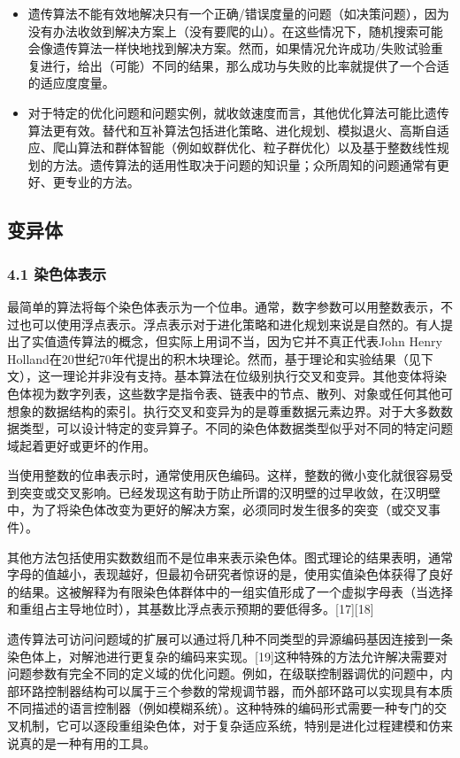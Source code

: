 \begin{itemize}
\item 遗传算法不能有效地解决只有一个正确/错误度量的问题（如决策问题），因为没有办法收敛到解决方案上（没有要爬的山）。在这些情况下，随机搜索可能会像遗传算法一样快地找到解决方案。然而，如果情况允许成功/失败试验重复进行，给出（可能）不同的结果，那么成功与失败的比率就提供了一个合适的适应度度量。
\item 对于特定的优化问题和问题实例，就收敛速度而言，其他优化算法可能比遗传算法更有效。替代和互补算法包括进化策略、进化规划、模拟退火、高斯自适应、爬山算法和群体智能（例如蚁群优化、粒子群优化）以及基于整数线性规划的方法。遗传算法的适用性取决于问题的知识量；众所周知的问题通常有更好、更专业的方法。
\end{itemize}

\subsection{变异体}
\subsubsection{4.1 染色体表示}
最简单的算法将每个染色体表示为一个位串。通常，数字参数可以用整数表示，不过也可以使用浮点表示。浮点表示对于进化策略和进化规划来说是自然的。有人提出了实值遗传算法的概念，但实际上用词不当，因为它并不真正代表John Henry Holland在20世纪70年代提出的积木块理论。然而，基于理论和实验结果（见下文），这一理论并非没有支持。基本算法在位级别执行交叉和变异。其他变体将染色体视为数字列表，这些数字是指令表、链表中的节点、散列、对象或任何其他可想象的数据结构的索引。执行交叉和变异为的是尊重数据元素边界。对于大多数数据类型，可以设计特定的变异算子。不同的染色体数据类型似乎对不同的特定问题域起着更好或更坏的作用。

当使用整数的位串表示时，通常使用灰色编码。这样，整数的微小变化就很容易受到突变或交叉影响。已经发现这有助于防止所谓的汉明壁的过早收敛，在汉明壁中，为了将染色体改变为更好的解决方案，必须同时发生很多的突变（或交叉事件）。

其他方法包括使用实数数组而不是位串来表示染色体。图式理论的结果表明，通常字母的值越小，表现越好，但最初令研究者惊讶的是，使用实值染色体获得了良好的结果。这被解释为有限染色体群体中的一组实值形成了一个虚拟字母表（当选择和重组占主导地位时），其基数比浮点表示预期的要低得多。[17][18]

遗传算法可访问问题域的扩展可以通过将几种不同类型的异源编码基因连接到一条染色体上，对解池进行更复杂的编码来实现。[19]这种特殊的方法允许解决需要对问题参数有完全不同的定义域的优化问题。例如，在级联控制器调优的问题中，内部环路控制器结构可以属于三个参数的常规调节器，而外部环路可以实现具有本质不同描述的语言控制器（例如模糊系统）。这种特殊的编码形式需要一种专门的交叉机制，它可以逐段重组染色体，对于复杂适应系统，特别是进化过程建模和仿来说真的是一种有用的工具。